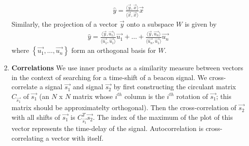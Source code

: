 \documentclass[10pt]{article}
\newcommand{\Est}[1]{\hat{#1}}
\begin{document}
\begin{multicols}{2}
\begin{enumerate}
\begin{align*}
        \Est{y} = \frac{\langle \vec{y} , \vec{x} \rangle}{\langle \vec{x} , \vec{x} \rangle}\vec{x}
    \end{align*}
    Similarly, the projection of a vector $\vec{y}$ onto a subspace $W$ is given by
    \begin{align*}
        \Est{y} = \frac{\langle \vec{y} , \vec{u_1} \rangle}{\langle \vec{u_1} , \vec{u_1} \rangle}\vec{u_1}
        + \hdots + \frac{\langle \vec{y} , \vec{u_n} \rangle}{\langle \vec{u_n} , \vec{u_1} \rangle}\vec{u_n}
    \end{align*}
    where $\left\{\vec{u_1}, \hdots, \vec{u_n}\right\}$ form an orthogonal basis for $W$. 
    \item \textbf{Correlations} We use inner products as a similarity measure between vectors in the context of
    searching for a time-shift of a beacon signal. We cross-correlate a signal $\vec{s_1}$ and signal $\vec{s_2}$ by first constructing the circulant matrix $C_{\vec{s_1}}$ of $\vec{s_1}$ (an $N$ x $N$ matrix whose $i^{th}$ column is the $i^{th}$ rotation of $\vec{s_1}$; this matrix should be approximatelty orthogonal). Then the cross-correlation of $\vec{s_2}$ with all shifts of $\vec{s_1}$ is $C_{\vec{s_1}}^T\vec{s_2}$. The index of the maximum of the plot of this vector represents the time-delay of the signal. Autocorrelation is cross-correlating a vector with itself.
    

\end{enumerate}
\end{multicols}
\end{document}
